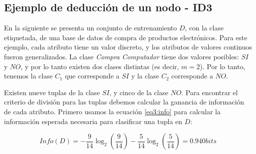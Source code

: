 
\subsection{Ejemplo de deducción de un nodo - ID3}

En la siguiente  se presenta un conjunto de entrenamiento $D$, con la clase etiquetada, de una base de datos de compra de productos electrónicos. Para este ejemplo, cada atributo tiene un valor discreto, y los atributos de valores continuos fueron generalizados. La clase \textit{Compra Computador} tiene dos valores posibles: $SI$ y $NO$, y por lo tanto existen dos clases distintas (es decir, $m=2$). Por lo tanto, tenemos la clase $C_1$ que corresponde a $SI$ y la clase $C_2$ corresponde a $NO$.

Existen nueve tuplas de la clase $SI$, y cinco de la clase $NO$. Para encontrar el criterio de división para las tuplas debemos calcular la ganancia de información de cada atributo. Primero usamos la ecuación \ref{eq3:info} para calcular la información esperada necesaria para clasificar una tupla en $D$:

\begin{equation*}
Info(D) = - \frac{9}{14}\log_2(\frac{9}{14}) - \frac{5}{14}\log_2(\frac{5}{14})	= 0.940 bits
\end{equation*}

